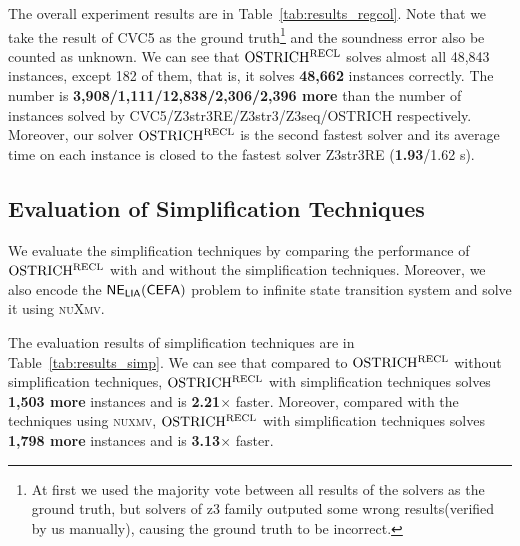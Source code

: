 The overall experiment results are in Table~\ref{tab:results_regcol}. Note that we take the result of CVC5 as the ground truth\footnote{At first we used the majority vote between all results of the solvers as the ground truth, but solvers of z3 family outputed some wrong results(verified by us manually), causing the ground truth to be incorrect.} and the soundness error also be counted as unknown. We can see that $\rm OSTRICH^{RECL}$ solves almost all 48,843 instances, except 182 of them, that is, it solves \textbf{48,662} instances correctly. The number is %
\textbf{3,908/1,111/12,838/2,306/2,396 more} than the number of instances solved by CVC5/Z3str3RE/Z3str3/Z3seq/OSTRICH respectively.
%      
%
Moreover, our solver $\rm OSTRICH^{RECL}$ is the second fastest solver and its average time on each instance is closed to the fastest solver Z3str3RE (\textbf{1.93}/1.62 s).
\vspace{-3mm}
\subsection{Evaluation of Simplification Techniques}
\vspace{-2mm}

We evaluate the simplification techniques by comparing the performance of $\rm OSTRICH^{RECL}$ with and without the simplification techniques. Moreover, we also encode the ${\sf NE_{LIA}(CEFA)}$ problem to infinite state transition system and solve it using \textsc{nuXmv}\cite{nuxmv}. 

The evaluation results of simplification techniques are in Table~\ref*{tab:results_simp}. We can see that compared to $\rm OSTRICH^{RECL}$ without simplification techniques, $\rm OSTRICH^{RECL}$ with simplification techniques solves \textbf{1,503 more} instances and is \textbf{2.21$\times$} faster. Moreover, compared with the techniques using \textsc{nuxmv}, $\rm OSTRICH^{RECL}$ with simplification techniques solves \textbf{1,798 more} instances and is \textbf{3.13$\times$} faster. 


